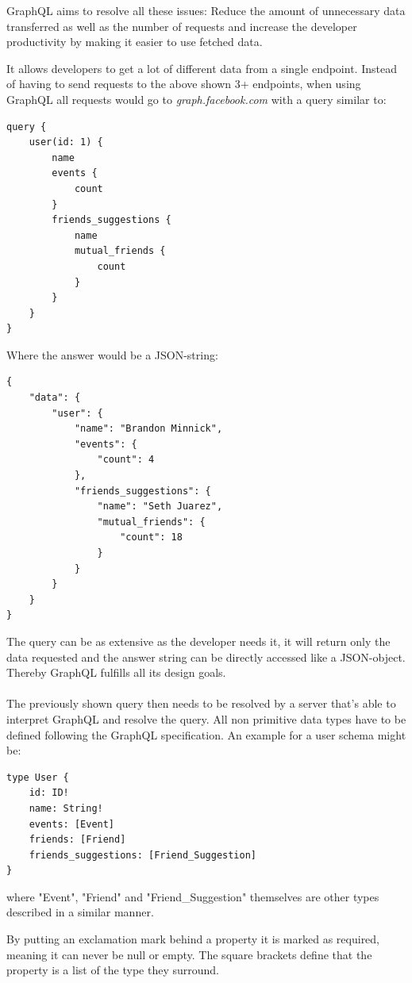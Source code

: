 GraphQL aims to resolve all these issues: Reduce the amount of unnecessary data transferred as well as the number of requests and increase the developer productivity by making it easier to use fetched data. \cite{EngineeringFB}

It allows developers to get a lot of different data from a single endpoint. Instead of having to send requests to the above shown 3+ endpoints, when using GraphQL all requests would go to \emph{graph.facebook.com} with a query similar to: \\
\newpage
\lstset{language=GraphQL}
\begin{lstlisting}[caption={A GraphQL Query to Fetch User Data},label={ex211}]
query {
	user(id: 1) {
		name
		events {
			count
		}
		friends_suggestions {
			name
			mutual_friends {
				count
			}
		}
	}
}
\end{lstlisting}
\citep[with adaptions]{GraphQLIntro}	
Where the answer would be a JSON-string:
\begin{lstlisting}[caption={Example Response Data},label={ex212}]
{ 
	"data": {
		"user": {
			"name": "Brandon Minnick",
			"events": {
				"count": 4
			},
			"friends_suggestions": {
				"name": "Seth Juarez",
				"mutual_friends": {
					"count": 18 
				}
			}
		}
	}
}
\end{lstlisting}
\citep[with adaptions]{GraphQLIntro}	

The query can be as extensive as the developer needs it, it will return only the data requested and the answer string can be directly accessed like a JSON-object. Thereby GraphQL fulfills all its design goals.
\\ \\
The previously shown query then needs to be resolved by a server that's able to interpret GraphQL and resolve the query. All non primitive data types have to be defined following the GraphQL specification. An example for a user schema might be:
\newpage
\begin{lstlisting}[caption={Type Definition in GraphQL}]
type User {
	id: ID! 
	name: String! 
	events: [Event] 
	friends: [Friend] 
	friends_suggestions: [Friend_Suggestion] 
}
\end{lstlisting}

\noindent
where "Event", "Friend" and "Friend\_Suggestion" themselves are other types described in a similar manner.

By putting an exclamation mark behind a property it is marked as required, meaning it can never be null or empty. The square brackets define that the property is a list of the type they surround.

